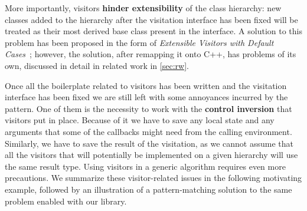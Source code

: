 More importantly, visitors {\bf hinder extensibility} of the class hierarchy: 
new classes added to the hierarchy after the visitation interface has been 
fixed will be treated as their most derived base class present in the interface.
A solution to this problem has been proposed in the form of \emph{Extensible 
Visitors with Default Cases}~\cite[]{Zenger:2001}; however, the 
solution, after remapping it onto C++, has problems of its own, discussed in 
detail in related work in \textsection\ref{sec:rw}.


Once all the boilerplate related to visitors has been written and the visitation 
interface has been fixed we are still left with some annoyances incurred by the 
pattern. One of them is the necessity to work with the {\bf control inversion} 
that visitors put in place. Because of it we have to save any local state and 
any arguments that some of the  callbacks might need from the 
calling environment. Similarly, we have to save the result of the visitation, 
as we cannot assume that all the visitors that will potentially be implemented 
on a given hierarchy will use the same result type. Using visitors in a generic 
algorithm requires even more precautions. We summarize these visitor-related 
issues in the following motivating example, followed by an illustration of a 
pattern-matching solution to the same problem enabled with our library.

